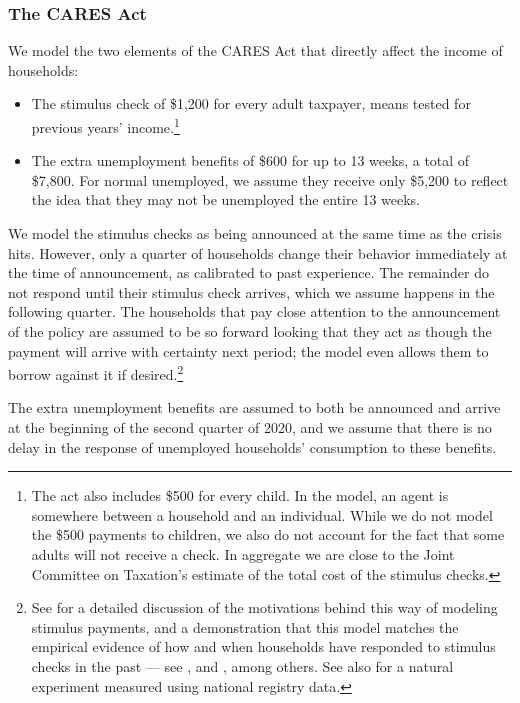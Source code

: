 \documentclass[titlepage,a4paper]{\econtex}
\begin{document}
\subsubsection{The CARES Act}

We model the two elements of the CARES Act that directly affect the income of households:
\begin{itemize}
\item The stimulus check of \$1,200 for every adult taxpayer, means tested for previous years' income.\footnote{The act also includes \$500 for every child. In the model, an agent is somewhere between a household and an individual. While we do not model the \$500 payments to children, we also do not account for the fact that some adults will not receive a check. In aggregate we are close to the Joint Committee on Taxation's estimate of the total cost of the stimulus checks.}
\item The extra unemployment benefits of \$600 for up to 13 weeks, a total of \$7,800.
  For normal unemployed, we assume they receive only \$5,200 to reflect the idea that they may not be unemployed the entire 13 weeks.
\end{itemize}

We model the stimulus checks as being announced at the same time as the crisis hits.
However, only a quarter of households change their behavior immediately at the time of announcement, as calibrated to past experience.
The remainder do not respond until their stimulus check arrives, which we assume happens in the following quarter.
The households that pay close attention to the announcement of the policy are assumed to be so forward looking that they act as though the payment will arrive with certainty next period; the model even allows them to borrow against it if desired.\footnote{See \cite{carroll_sticky_2020} for a detailed discussion of the motivations behind this way of modeling stimulus payments, and a demonstration that this model matches the empirical evidence of how and when households have responded to stimulus checks in the past --- see \cite{psjmMPC2008}, \cite{brodaParker} and \cite{parker25million}, among others.  See also \cite{fhnMPC} for a natural experiment measured using national registry data.}

The extra unemployment benefits are assumed to both be announced and arrive at the beginning of the second quarter of 2020, and we assume that there is no delay in the response of unemployed households' consumption to these benefits.
\end{document}
